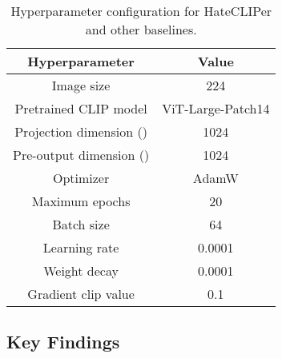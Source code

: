 \documentclass[11pt]{article}
\begin{document}
\begin{table}[!h]
\begin{center}
\begin{tabular}{c c} 
\hline
Hyperparameter        & Value \\
\hline
Image size & 224 \\
Pretrained CLIP model & ViT-Large-Patch14  \\
Projection dimension () & 1024 \\
Pre-output dimension () & 1024 \\
Optimizer & AdamW \\
Maximum epochs & 20 \\
Batch size & 64 \\
Learning rate & 0.0001 \\
Weight decay & 0.0001 \\
Gradient clip value & 0.1 \\
\hline
\end{tabular}
\end{center}
\caption{Hyperparameter configuration for HateCLIPer and other baselines.}
\label{tab:hyper}
\end{table}


\subsection{Key Findings}
\end{document}

